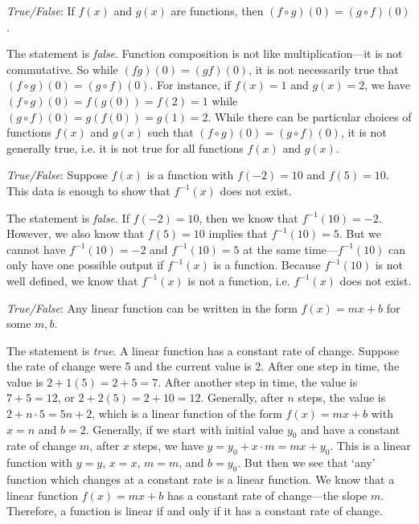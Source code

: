 \documentclass[11pt,letterpaper]{article}
\begin{document}
\quizsol \textit{True/False}: If $f(x)$ and $g(x)$ are functions, then $(f \circ g)(0)= (g \circ f)(0)$. \pspace

\sol The statement is \textit{false}. Function composition is not like multiplication---it is not commutative. So while $(fg)(0)= (gf)(0)$, it is not necessarily true that $(f \circ g)(0)= (g \circ f)(0)$. For instance, if $f(x)= 1$ and $g(x)= 2$, we have $(f \circ g)(0)= f(g(0))= f(2)= 1$ while $(g \circ f)(0)= g(f(0))= g(1)= 2$. While there can be particular choices of functions $f(x)$ and $g(x)$ such that $(f \circ g)(0)= (g \circ f)(0)$, it is not generally true, i.e. it is not true for all functions $f(x)$ and $g(x)$. \pvspace{1.4cm}



\quizsol \textit{True/False}: Suppose $f(x)$ is a function with $f(-2)= 10$ and $f(5)= 10$. This data is enough to show that $f^{-1}(x)$ does not exist. \pspace

\sol The statement is \textit{false}. If $f(-2)= 10$, then we know that $f^{-1}(10)= -2$. However, we also know that $f(5)= 10$ implies that $f^{-1}(10)= 5$. But we cannot have $f^{-1}(10)= -2$ and $f^{-1}(10)= 5$ at the same time---$f^{-1}(10)$ can only have one possible output if $f^{-1}(x)$ is a function. Because $f^{-1}(10)$ is not well defined, we know that $f^{-1}(x)$ is not a function, i.e. $f^{-1}(x)$ does not exist. 





\newpage




\quizsol \textit{True/False}: Any linear function can be written in the form $f(x)= mx + b$ for some $m, b$. \pspace

\sol \sol The statement is \textit{true}. A linear function has a constant rate of change. Suppose the rate of change were 5 and the current value is 2. After one step in time, the value is $2 + 1(5)= 2 + 5= 7$. After another step in time, the value is $7 + 5= 12$, or $2 + 2(5)= 2 + 10= 12$. Generally, after $n$ steps, the value is $2 + n \cdot 5= 5n + 2$, which is a linear function of the form $f(x)= mx + b$ with $x= n$ and $b= 2$. Generally, if we start with initial value $y_0$ and have a constant rate of change $m$, after $x$ steps, we have $y= y_0 + x \cdot m= mx + y_0$. This is a linear function with $y= y$, $x= x$, $m= m$, and $b= y_0$. But then we see that `any' function which changes at a constant rate is a linear function. We know that a linear function $f(x)= mx + b$ has a constant rate of change---the slope $m$. Therefore, a function is linear if and only if it has a constant rate of change. \pvspace{1.5cm}
\end{document}
